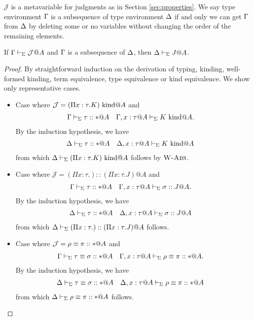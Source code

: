 $\mathcal{J}$ is a metavariable for judgments as in Section \ref{sec:properties}.
We say type environment \(\Gamma\) is a subsequence of type environment \(\Delta\)
if and only we can get \(\Gamma\) from \(\Delta\) by deleting some or no variables without changing the order of the remaining elements.
\begin{lemma}[Weakening]
	If \(\Gamma \vdash_\Sigma \mathcal{J}@A\) and \(\Gamma\) is a subsequence of \(\Delta\), then \(\Delta \vdash_\Sigma J@A\). 
\end{lemma}

\begin{proof}
	By straightforward induction on the derivation of typing, kinding, well-formed kinding,
	term equivalence, type equivalence or kind equivalence.
	We show only representative cases.
	\begin{itemize}
		\item[] Case \WAbs{} where $\mathcal{J} = (\Pi x:\tau.K)\text{\ kind} @A$ and 
		      \begin{align*} 
		      	  & \G \V \tau :: * @ A &   & \G,x:\tau@A \V K \iskind @A. 
		      \end{align*}
		      By the induction hypothesis, we have
		      \begin{align*}
		      	  & \D \V \tau::*@A &   & \D, x:\tau@A \V K \iskind @ A 
		      \end{align*}
		      from which $\Delta\vdash_\Sigma (\Pi x:\tau.K) \text{\ kind} @ A$ follows by $\textsc{W-Abs}$.
		      
		\item[] Case \KAbs{} where $\mathcal{J} = (\Pi x:\tau.) :: (\Pi x:\tau.J)@A$ and 
		      \begin{align*} 
		      	  & \G \V \tau::*@A &   & \G,x:\tau@A\V \sigma :: J @ A. 
		      \end{align*}
		      By the induction hypothesis, we have
		      \begin{align*} 
		      	  & \D \V \tau::*@A &   & \D,x:\tau@A\V \sigma :: J @ A 
		      \end{align*}
		      from which $\Delta \vdash_\Sigma (\Pi x:\tau.) :: (\Pi x:\tau.J)@A$ follows.
		      
		\item[] Case \QTAbs{} where \( \mathcal{J} = \rho \equiv \pi :: * @ A \) and
		      \begin{align*} 
		      	  & \G\V \tau \E \sigma :: *@A &   & \G,x:\tau@A \V \rho \E \pi :: *@A. 
		      \end{align*}
		      By the induction hypothesis, we have
		      \begin{align*} 
		      	  & \D\V \tau \E \sigma :: *@A &   & \D,x:\tau@A \V \rho \E \pi :: *@A 
		      \end{align*}
		      from which \( \Delta\vdash_\Sigma \rho \equiv \pi :: * @ A \) follows.
		      

\end{itemize}
\end{proof}

